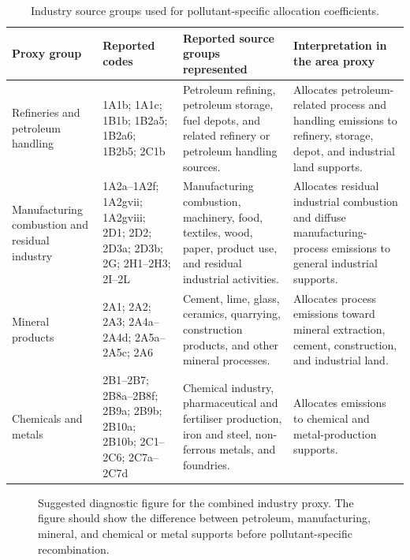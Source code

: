 \begin{table}[htbp]
  \centering
  \caption{Industry source groups used for pollutant-specific allocation coefficients.}
  \label{tab:industry-alpha-groups}
  \scriptsize
  \begin{tabular}{p{} p{} p{} p{}}
    \toprule
    Proxy group & Reported codes & Reported source groups represented & Interpretation in the area proxy \\
    \midrule
    Refineries and petroleum handling &
    1A1b; 1A1c; 1B1b; 1B2a5; 1B2a6; 1B2b5; 2C1b &
    Petroleum refining, petroleum storage, fuel depots, and related refinery or petroleum handling sources. &
    Allocates petroleum-related process and handling emissions to refinery, storage, depot, and industrial land supports. \\
    Manufacturing combustion and residual industry &
    1A2a--1A2f; 1A2gvii; 1A2gviii; 2D1; 2D2; 2D3a; 2D3b; 2G; 2H1--2H3; 2I--2L &
    Manufacturing combustion, machinery, food, textiles, wood, paper, product use, and residual industrial activities. &
    Allocates residual industrial combustion and diffuse manufacturing-process emissions to general industrial supports. \\
    Mineral products &
    2A1; 2A2; 2A3; 2A4a--2A4d; 2A5a--2A5c; 2A6 &
    Cement, lime, glass, ceramics, quarrying, construction products, and other mineral processes. &
    Allocates process emissions toward mineral extraction, cement, construction, and industrial land. \\
    Chemicals and metals &
    2B1--2B7; 2B8a--2B8f; 2B9a; 2B9b; 2B10a; 2B10b; 2C1--2C6; 2C7a--2C7d &
    Chemical industry, pharmaceutical and fertiliser production, iron and steel, non-ferrous metals, and foundries. &
    Allocates emissions to chemical and metal-production supports. \\
    \bottomrule
  \end{tabular}
\end{table}


\begin{figure}[htbp]
  \centering
  \caption{Suggested diagnostic figure for the combined industry proxy.
  The figure should show the difference between petroleum, manufacturing,
  mineral, and chemical or metal supports before
  pollutant-specific recombination.}
  \label{fig:industry-combined-proxy-placeholder}
\end{figure}


